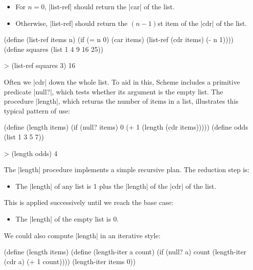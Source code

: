 \begin{itemize}
\item For $n = 0$, \scheme|list-ref| should return the \scheme|car| of
  the list.

\item Otherwise, \scheme|list-ref| should return the $(n - 1)$st item
  of the \scheme|cdr| of the list.
\end{itemize}

\begin{schemedisplay}
(define (list-ref items n)
  (if (= n 0)
      (car items)
      (list-ref (cdr items) (- n 1))))
(define squares (list 1 4 9 16 25))

> (list-ref squares 3)
16
\end{schemedisplay}

Often we \scheme|cdr| down the whole list.  To aid in this, Scheme
includes a primitive predicate \scheme|null?|, which tests whether its
argument is the empty list.  The procedure \scheme|length|, which
returns the number of items in a list, illustrates this typical
pattern of use:

\begin{schemedisplay}
(define (length items)
  (if (null? items)
      0
      (+ 1 (length (cdr items)))))
(define odds (list 1 3 5 7))

> (length odds)
4
\end{schemedisplay}
The \scheme|length| procedure implements a simple recursive plan. The
reduction step is:

\begin{itemize}
\item The \scheme|length| of any list is 1 plus the \scheme|length| of
  the \scheme|cdr| of the list.
\end{itemize}

This is applied successively until we reach the base case:

\begin{itemize}
\item The \scheme|length| of the empty list is 0.
\end{itemize}

We could also compute \scheme|length| in an iterative style:

\begin{schemedisplay}
(define (length items)
  (define (length-iter a count)
    (if (null? a)
        count
        (length-iter (cdr a) (+ 1 count))))
  (length-iter items 0))
\end{schemedisplay}

